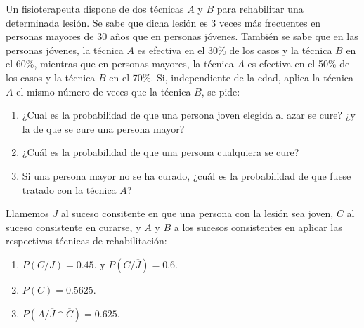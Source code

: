 {Un fisioterapeuta dispone de dos técnicas $A$ y $B$ para rehabilitar una determinada lesión. Se sabe que dicha lesión es 3 veces más
frecuentes en personas mayores de 30 años que en personas jóvenes. También se sabe que en las personas jóvenes, la técnica $A$ es efectiva
en el 30\% de los casos y la técnica $B$ en el 60\%, mientras que en personas mayores, la técnica $A$ es efectiva en el 50\% de los casos y
la técnica $B$ en el 70\%. Si, independiente de la edad, aplica la técnica $A$ el mismo número de veces que la técnica $B$, se pide:
\begin{enumerate}
\item ¿Cual es la probabilidad de que una persona joven elegida al azar se cure? ¿y la de que se cure una persona mayor?
\item ¿Cuál es la probabilidad de que una persona cualquiera se cure?
\item Si una persona mayor no se ha curado, ¿cuál es la probabilidad de que fuese tratado con la técnica $A$?
\end{enumerate}
} 
{Llamemos $J$ al suceso consitente en que una persona con la lesión sea joven, $C$ al suceso consistente en curarse, y $A$ y $B$ a los sucesos consistentes en aplicar las respectivas técnicas de
rehabilitación:
\begin{enumerate}
\item $P(C/J)=0.45.$ y $P(C/\overline{J})=0.6$.
\item $P(C)=0.5625$.
\item $P(A/\overline{J}\cap \overline{C})=0.625$.
\end{enumerate}
}
